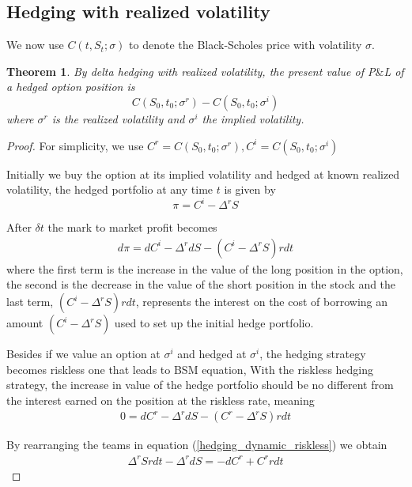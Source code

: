 \documentclass[10pt]{article}
\theoremstyle{plain}
\newtheorem{theorem}{Theorem}[section]
\numberwithin{equation}{section}
\numberwithin{table}{section}
\newcommand{\s}{\sigma}
\newcommand{\de}{\delta}
\begin{document}
\subsection{Hedging with realized volatility}

We now use $C(t,S_t; \s)$ to denote the Black-Scholes price with volatility $\s$. 

\begin{theorem}
    By delta hedging with realized volatility, the present value of P$\&$L of a hedged option position is 
    \[
        C(S_0,t_0;\s^r)-C(S_0,t_0;\s^i)    
    \]
    where $\s^r$ is the realized volatility and $\s^i$ the implied volatility.

    \label{theorem_hedging_real_vol}
\end{theorem}


\begin{proof}
    For simplicity, we use $C^r = C(S_0,t_0;\s^r), C^i = C(S_0,t_0;\s^i)$

    Initially we buy the option at its implied volatility and hedged at known realized volatility, the hedged portfolio
    at any time $t$ is given by
    \[
        \pi = C^i - \Delta^r S    
    \]

    After $\de t$ the mark to market profit becomes
    \begin{eqnarray}
        d\pi = dC^i - \Delta^r dS - (C^i -\Delta^r S)rdt  
        \label{hedging_dynamic_real_vol}     
    \end{eqnarray}
    where the first term is the increase in the value of the long position in the option, the
    second is the decrease in the value of the short position in the stock and the last term, $(C^i -\Delta^r S)rdt$, represents the interest on the cost
    of borrowing an amount $(C^i -\Delta^r S)$ used to set up the initial hedge portfolio.

    Besides if we value an option at $\s^i$ and hedged at $\s^i$, the hedging strategy becomes riskless one that leads to BSM equation, With the riskless
    hedging strategy, the increase in value of the hedge portfolio should be no different from the interest earned on the position at the riskless rate, meaning 
    \begin{eqnarray}
        0 = dC^r - \Delta^r dS - (C^r -\Delta^r S)rdt 
        \label{hedging_dynamic_riskless}
    \end{eqnarray}
    
    By rearranging the teams in equation (\ref{hedging_dynamic_riskless}) we obtain 
    \begin{eqnarray}
        \Delta^r S rdt  - \Delta^r dS = - dC^r + C^r rdt    
        \label{hedging_dynamic_real_vol_relation}
    \end{eqnarray} 
    

\end{proof}
\end{document}
